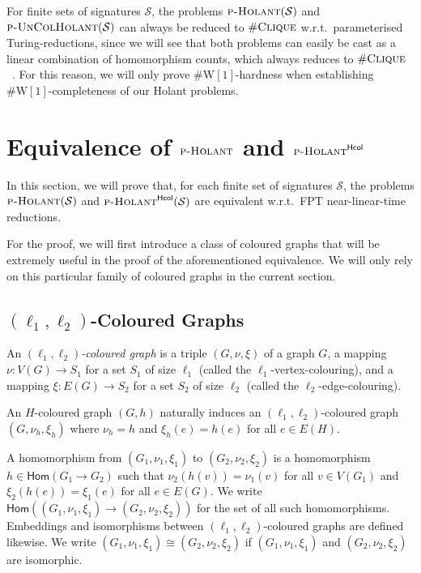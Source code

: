 \documentclass[authorcolumns,numberwithinsect]{no-lipics-v2022}
\newcommand{\homs}[2]{\mathsf{Hom}(#1 \to #2)}
\newcommand{\W}{\mathrm{W}}
\newcommand{\holantprob}{\text{\sc{p-Holant}}}
\newcommand{\holantprobstar}{\text{\sc{p-Holant}}^{\mathsf{Hcol}}}
\begin{document}
\begin{remark}
    For finite sets of signatures $\mathcal{S}$, the problems $\textsc{p-Holant}(\mathcal{S})$ and $\textsc{p-UnColHolant}(\mathcal{S})$ can always be reduced to $\#\textsc{Clique}$ w.r.t.\ parameterised Turing-reductions, since we will see that both problems can easily be cast as a linear combination of homomorphism counts, which always reduces to $\#\textsc{Clique}$~\cite{DalmauJ04}. For this reason, we will only prove $\#\W[1]$-hardness when establishing $\#\W[1]$-completeness of our Holant problems.
\end{remark}

\section{Equivalence of $\holantprob$ and $\holantprobstar$}\label{sec:col_holants_equivalences}

In this section, we will prove that, for each finite set of signatures $\mathcal{S}$, the problems $\holantprob(\mathcal{S})$ and $\holantprobstar(\mathcal{S})$ are equivalent w.r.t.\ FPT near-linear-time reductions. 

For the proof, we will first introduce a class of coloured graphs that will be extremely useful in the proof of the aforementioned equivalence. We will only rely on this particular family of coloured graphs in the current section.

\subsection{$(\ell_1,\ell_2)$-Coloured Graphs}

An $(\ell_1,\ell_2)$\emph{-coloured graph} is a triple $(G,\nu,\xi)$ of a graph $G$, a mapping $\nu: V(G) \to S_1$ for a set $S_1$ of size $\ell_1$ (called the $\ell_1$-vertex-colouring), and a mapping $\xi: E(G) \to S_2$ for a set $S_2$ of size $\ell_2$ (called the $\ell_2$-edge-colouring). 

\begin{remark}
   An $H$-coloured graph $(G,h)$ naturally induces an $(\ell_1,\ell_2)$-coloured graph $(G,\nu_h,\xi_h)$ where $\nu_h=h$ and $\xi_h(e)=h(e)$ for all $e\in E(H)$.
\end{remark}


A homomorphism from $(G_1,\nu_1,\xi_1)$ to $(G_2,\nu_2,\xi_2)$ is a homomorphism $h\in \homs{G_1}{G_2}$ such that $\nu_2(h(v))=\nu_1(v)$ for all $v\in V(G_1)$ and $\xi_2(h(e))= \xi_1(e)$ for all $e\in E(G)$. We write $\homs{(G_1,\nu_1,\xi_1)}{(G_2,\nu_2,\xi_2)}$ for the set of all such homomorphisms. Embeddings and isomorphisms between $(\ell_1,\ell_2)$-coloured graphs are defined likewise. We write $(G_1,\nu_1,\xi_1)\cong (G_2,\nu_2,\xi_2)$ if $(G_1,\nu_1,\xi_1)$ and $(G_2,\nu_2,\xi_2)$ are isomorphic.
\end{document}
